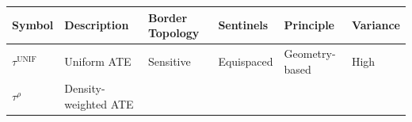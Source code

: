 \documentclass[letter]{article}
\newcommand{\unifavg}{\tau^{\mathrm{UNIF}}}
\newcommand{\taurho}{\tau^{\rho}}
\begin{document}
\begin{longtable}[]{@{}llllll@{}}
\toprule
\begin{minipage}[b]{0.09\columnwidth}\raggedright\strut
Symbol\strut
\end{minipage} & \begin{minipage}[b]{0.25\columnwidth}\raggedright\strut
Description\strut
\end{minipage} & \begin{minipage}[b]{0.13\columnwidth}\raggedright\strut
Border Topology\strut
\end{minipage} & \begin{minipage}[b]{0.13\columnwidth}\raggedright\strut
Sentinels\strut
\end{minipage} & \begin{minipage}[b]{0.15\columnwidth}\raggedright\strut
Principle\strut
\end{minipage} & \begin{minipage}[b]{0.08\columnwidth}\raggedright\strut
Variance\strut
\end{minipage}\tabularnewline
\midrule
\endhead
\begin{minipage}[t]{0.09\columnwidth}\raggedright\strut
\(\unifavg\)\strut
\end{minipage} & \begin{minipage}[t]{0.25\columnwidth}\raggedright\strut
Uniform ATE\strut
\end{minipage} & \begin{minipage}[t]{0.13\columnwidth}\raggedright\strut
Sensitive\strut
\end{minipage} & \begin{minipage}[t]{0.13\columnwidth}\raggedright\strut
Equispaced\strut
\end{minipage} & \begin{minipage}[t]{0.15\columnwidth}\raggedright\strut
Geometry-based\strut
\end{minipage} & \begin{minipage}[t]{0.08\columnwidth}\raggedright\strut
High\strut
\end{minipage}\tabularnewline
\begin{minipage}[t]{0.09\columnwidth}\raggedright\strut
\(\taurho\)\strut
\end{minipage} & \begin{minipage}[t]{0.25\columnwidth}\raggedright\strut
Density-weighted ATE\strut
\end{minipage} & \begin{minipage}[t]{0.13\columnwidth}\raggedright\strut

\end{minipage}
\end{longtable}
\end{document}

